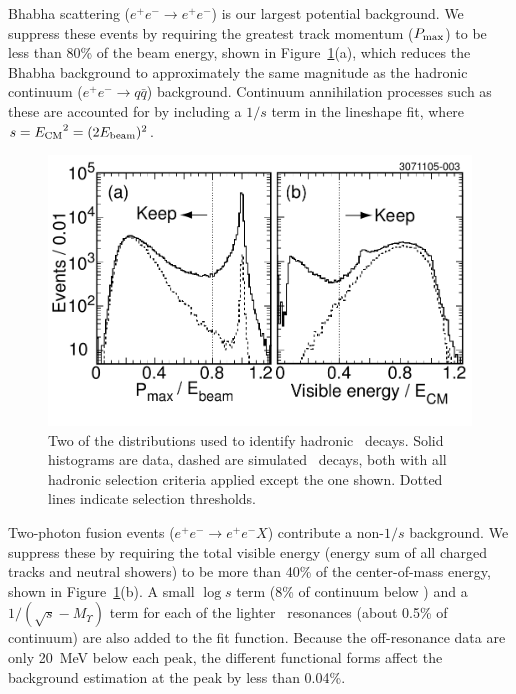 \documentclass[aps,prl,twocolumn,superscriptaddress,showpacs,floatfix]{revtex4}
\begin{document}
Bhabha scattering ($e^+e^- \to e^+e^-$) is our largest potential
background.  We suppress these events by requiring the greatest track
momentum ($P_{\mbox{\scriptsize max}}$) to be less than 80\% of the
beam energy, shown in Figure~\ref{fig:cuts}(a), which reduces the
Bhabha background to approximately the same magnitude as the hadronic
continuum ($e^+e^- \to q\bar{q}$) background.  Continuum annihilation
processes such as these are accounted for by including a $1/s$ term in
the lineshape fit, where $s = {E_{\mbox{\scriptsize CM}}}^2 = (2
E_{\mbox{\scriptsize beam}})^2$.

\begin{figure}
  \includegraphics[width=\linewidth]{cuts}
  \caption{\label{fig:cuts} Two of the distributions used to identify
hadronic \ups\ decays.  Solid histograms are data, dashed are
simulated \us\ decays, both with all hadronic selection criteria
applied except the one shown.  Dotted lines indicate selection
thresholds.}
\end{figure}

Two-photon fusion events ($e^+e^- \to e^+e^- X$) contribute a
non-$1/s$ background.  We suppress these by requiring the total
visible energy (energy sum of all charged tracks and neutral showers)
to be more than 40\% of the center-of-mass energy, shown in
Figure~\ref{fig:cuts}(b).  A small $\log s$ term (8\% of continuum
below \us) and a $1/(\sqrt{s}-M_\Upsilon)$ term for each of the
lighter \ups\ resonances (about 0.5\% of continuum) are also added to
the fit function.  Because the off-resonance data are only 20~MeV
below each peak, the different functional forms affect the background
estimation at the peak by less than 0.04\%.
\end{document}
